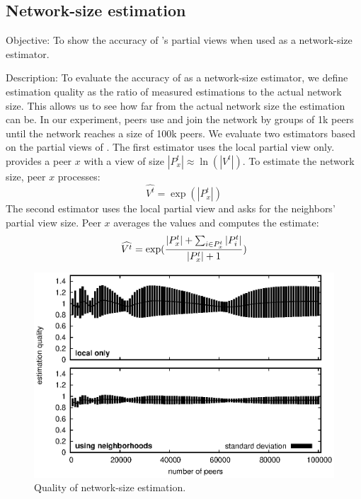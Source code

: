 \subsection{Network-size estimation}

\begin{asparadesc}
\item [Objective:] To show the accuracy of \SPRAY's partial views when used as a
  network-size estimator.
\item [Description:] To evaluate the accuracy of \SPRAY as a
  network-size estimator, we define estimation quality as the ratio of
  measured estimations to the actual network size. This allows us to
  see how far from the actual network size the estimation can be.  In
  our experiment, peers use \SPRAY and join the network by groups of
  1k peers until the network reaches a size of 100k peers. We evaluate
  two estimators based on the partial views of \SPRAY. The first
  estimator uses the local partial view only.  \SPRAY provides a peer
  $x$ with a view of size $|P^t_x| \approx \ln(|V^t|)$. To estimate
  the network size, peer $x$ processes:
  \begin{equation*}
    \widehat{V^t}= \exp{(|P^t_x|)}
  \end{equation*}
  The second estimator uses the local partial view and asks for the neighbors'
  partial view size. Peer $x$ averages the values and computes the estimate:
  \begin{equation*}
    \widehat{V^t} = \exp({ {|P^t_x| + \sum_{i \in P^t_x} {|P^t_i|}} \over{|P^t_x|+1} })
  \end{equation*}

\begin{figure}
  \centering
  \includegraphics[width=\SCALE\columnwidth]{img/estimator.eps}
  \caption{\label{fig:estimator}Quality of network-size estimation.}
\end{figure}


\end{asparadesc}
